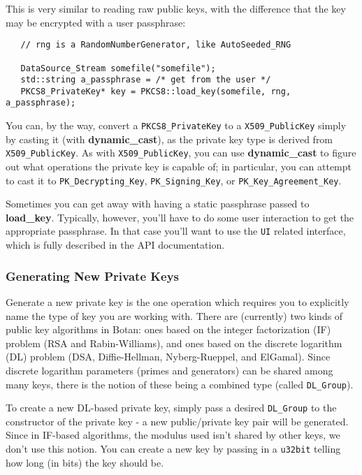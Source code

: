 \documentclass{article}
\newcommand{\function}[1]{\textbf{#1}}
\newcommand{\type}[1]{\texttt{#1}}
\begin{document}
This is very similar to reading raw public keys, with the difference that the
key may be encrypted with a user passphrase:

\begin{verbatim}
   // rng is a RandomNumberGenerator, like AutoSeeded_RNG

   DataSource_Stream somefile("somefile");
   std::string a_passphrase = /* get from the user */
   PKCS8_PrivateKey* key = PKCS8::load_key(somefile, rng, a_passphrase);
\end{verbatim}

You can, by the way, convert a \type{PKCS8\_PrivateKey} to a
\type{X509\_PublicKey} simply by casting it (with \function{dynamic\_cast}), as
the private key type is derived from \type{X509\_PublicKey}. As with
\type{X509\_PublicKey}, you can use \function{dynamic\_cast} to figure out what
operations the private key is capable of; in particular, you can attempt to
cast it to \type{PK\_Decrypting\_Key}, \type{PK\_Signing\_Key}, or
\type{PK\_Key\_Agreement\_Key}.

Sometimes you can get away with having a static passphrase passed to
\function{load\_key}. Typically, however, you'll have to do some user
interaction to get the appropriate passphrase. In that case you'll want to use
the \type{UI} related interface, which is fully described in the API
documentation.

\subsubsection{Generating New Private Keys}

Generate a new private key is the one operation which requires you to
explicitly name the type of key you are working with. There are (currently) two
kinds of public key algorithms in Botan: ones based on the integer
factorization (IF) problem (RSA and Rabin-Williams), and ones based on the
discrete logarithm (DL) problem (DSA, Diffie-Hellman, Nyberg-Rueppel, and
ElGamal). Since discrete logarithm parameters (primes and generators) can be
shared among many keys, there is the notion of these being a combined type
(called \type{DL\_Group}).

To create a new DL-based private key, simply pass a desired \type{DL\_Group} to
the constructor of the private key - a new public/private key pair will be
generated. Since in IF-based algorithms, the modulus used isn't shared by other
keys, we don't use this notion. You can create a new key by passing in a
\type{u32bit} telling how long (in bits) the key should be.
\end{document}
